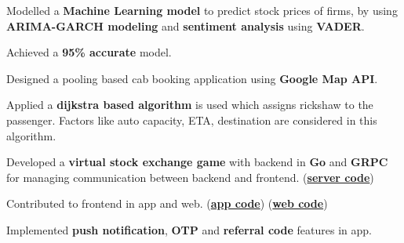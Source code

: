 \documentclass[]{deedy-resume-openfont}
\begin{document}
\begin{minipage}[t]{0.67\textwidth}
\begin{tightemize}
\item Modelled a \textbf{Machine Learning model} to predict stock prices of firms, by using \textbf{ARIMA-GARCH modeling} and \textbf{sentiment analysis} using \textbf{VADER}.
\item Achieved a \textbf{95\% accurate} model.
\end{tightemize}
\sectionsep


\begin{tightemize}
\item Designed a pooling based cab booking application using \textbf{Google Map API}.
\item Applied a \textbf{dijkstra based algorithm} is used which assigns rickshaw to the passenger. Factors like auto capacity, ETA, destination are considered in this algorithm.

\end{tightemize}
\sectionsep


\begin{tightemize}
\item Developed a \textbf{virtual stock exchange game} with backend in \textbf{Go} and \textbf{GRPC} for managing communication between backend and frontend. (\textbf{\href{https://github.com/delta/dalal-street-server}{server code}})
\item Contributed to frontend in app and web. (\textbf{\href{https://github.com/delta/dalal-street-android}{app code}}) (\textbf{\href{https://github.com/delta/dalal-street-web}{web code}})
\item Implemented \textbf{push notification}, \textbf{OTP} and \textbf{referral code}  features in app.
\end{tightemize}





\end{minipage}
\end{document}
